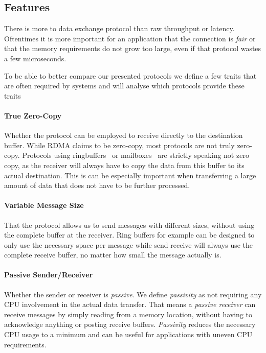 


\pagebreak
\subsection{Features}

There is more to data exchange protocol than raw throughput or latency. Oftentimes it is more important for an application
that the connection is \emph{fair} or that the memory requirements do not grow too large, even if that protocol wastes
a few microseconds.

To be able to better compare our presented protocols we define a few traits that are often required by systems and will 
analyse which protocols provide these traits

\paragraph{True Zero-Copy} Whether the protocol can be employed to receive directly to the destination buffer. While RDMA 
claims to be zero-copy, most protocols are not truly zero-copy. Protocols using ringbuffers~\cite{} or mailboxes~\cite{} are
strictly speaking not zero copy, as the receiver will always have to copy the data from this buffer to its actual destination.
This is can be especially important when transferring a large amount of data that does not have to be further processed.

\paragraph{Variable Message Size} That the protocol allows us to send messages with different sizes, without using the 
complete buffer at the receiver. Ring buffers for example can be designed to only use the necessary space per message
while send receive will always use the complete receive buffer, no matter how small the message actually is.

\paragraph{Passive Sender/Receiver} Whether the sender or receiver is \emph{passive}. We define \emph{passivity} as not 
requiring any CPU involvement in the actual data transfer. That means a \emph{passive receiver} can receive messages by
simply reading from a memory location, without having to acknowledge anything or posting receive buffers. \emph{Passivity} 
reduces the necessary CPU usage to a minimum and can be useful for applications with uneven CPU requirements.

